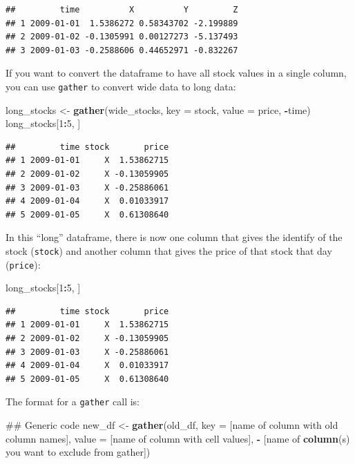 \documentclass[]{book}
\makeatletter
\newenvironment{Shaded}{\begin{snugshade}}{\end{snugshade}}
\newcommand{\KeywordTok}[1]{\textcolor[rgb]{0.13,0.29,0.53}{\textbf{#1}}}
\newcommand{\DataTypeTok}[1]{\textcolor[rgb]{0.13,0.29,0.53}{#1}}
\newcommand{\DecValTok}[1]{\textcolor[rgb]{0.00,0.00,0.81}{#1}}
\newcommand{\StringTok}[1]{\textcolor[rgb]{0.31,0.60,0.02}{#1}}
\newcommand{\OperatorTok}[1]{\textcolor[rgb]{0.81,0.36,0.00}{\textbf{#1}}}
\newcommand{\NormalTok}[1]{#1}
\newenvironment{kframe}{%
\medskip{}
\setlength{\fboxsep}{.8em}
 \def\at@end@of@kframe{}%
 \ifinner\ifhmode%
  \def\at@end@of@kframe{\end{minipage}}%
  \begin{minipage}{\columnwidth}%
 \fi\fi%
 \def\FrameCommand##1{\hskip\@totalleftmargin \hskip-\fboxsep
 \colorbox{shadecolor}{##1}\hskip-\fboxsep
     \hskip-\linewidth \hskip-\@totalleftmargin \hskip\columnwidth}%
 \MakeFramed {\advance\hsize-\width
   \@totalleftmargin\z@ \linewidth\hsize
   \@setminipage}}%
 {\par\unskip\endMakeFramed%
 \at@end@of@kframe}
\renewenvironment{Shaded}{\begin{kframe}}{\end{kframe}}
\theoremstyle{definition}
\theoremstyle{definition}
\theoremstyle{definition}
\theoremstyle{remark}
\makeatother
\begin{document}
\begin{verbatim}
##         time          X          Y         Z
## 1 2009-01-01  1.5386272 0.58343702 -2.199889
## 2 2009-01-02 -0.1305991 0.00127273 -5.137493
## 3 2009-01-03 -0.2588606 0.44652971 -0.832267
\end{verbatim}

If you want to convert the dataframe to have all stock values in a
single column, you can use \texttt{gather} to convert wide data to long
data:

\begin{Shaded}
\begin{Highlighting}[]
\NormalTok{long_stocks <-}\StringTok{ }\KeywordTok{gather}\NormalTok{(wide_stocks, }\DataTypeTok{key =}\NormalTok{ stock,}
                      \DataTypeTok{value =}\NormalTok{ price, }\OperatorTok{-}\NormalTok{time)}
\NormalTok{long_stocks[}\DecValTok{1}\OperatorTok{:}\DecValTok{5}\NormalTok{, ]}
\end{Highlighting}
\end{Shaded}

\begin{verbatim}
##         time stock       price
## 1 2009-01-01     X  1.53862715
## 2 2009-01-02     X -0.13059905
## 3 2009-01-03     X -0.25886061
## 4 2009-01-04     X  0.01033917
## 5 2009-01-05     X  0.61308640
\end{verbatim}

In this ``long'' dataframe, there is now one column that gives the
identify of the stock (\texttt{stock}) and another column that gives the
price of that stock that day (\texttt{price}):

\begin{Shaded}
\begin{Highlighting}[]
\NormalTok{long_stocks[}\DecValTok{1}\OperatorTok{:}\DecValTok{5}\NormalTok{, ]}
\end{Highlighting}
\end{Shaded}

\begin{verbatim}
##         time stock       price
## 1 2009-01-01     X  1.53862715
## 2 2009-01-02     X -0.13059905
## 3 2009-01-03     X -0.25886061
## 4 2009-01-04     X  0.01033917
## 5 2009-01-05     X  0.61308640
\end{verbatim}

The format for a \texttt{gather} call is:

\begin{Shaded}
\begin{Highlighting}[]
\NormalTok{## Generic code}
\NormalTok{new_df <-}\StringTok{ }\KeywordTok{gather}\NormalTok{(old_df,}
                 \DataTypeTok{key =}\NormalTok{ [name of column with old column names],}
                 \DataTypeTok{value =}\NormalTok{ [name of column with cell values],}
                 \OperatorTok{-}\StringTok{ }\NormalTok{[name of }\KeywordTok{column}\NormalTok{(s) you want to }
\NormalTok{                    exclude from gather])}
\end{Highlighting}
\end{Shaded}
\end{document}
